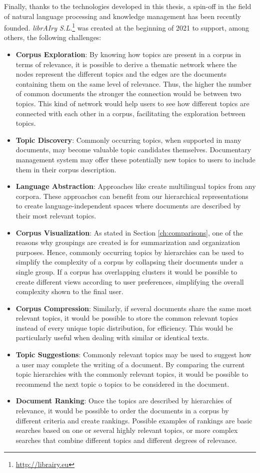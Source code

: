 Finally, thanks to the technologies developed in this thesis, a spin-off in the field of natural language processing and knowledge management has been recently founded. \textit{librAIry S.L.}\footnote{\url{http://librairy.eu}} was created at the beginning of 2021 to support, among others, the following challenges:
\begin{itemize}
\item \textbf{Corpus Exploration}: By knowing how topics are present in a corpus in terms of relevance, it is possible to derive a thematic network where the nodes represent the different topics and the edges are the documents containing them on the same level of relevance. Thus, the higher the number of common documents the stronger the connection would be between two topics. This kind of network would help users to see how different topics are connected with each other in a corpus, facilitating the exploration between topics.
\item \textbf{Topic Discovery}: Commonly occurring topics, when supported in many documents, may become valuable topic candidates themselves. Documentary management system may offer these potentially new topics to users to include them in their corpus description.
\item \textbf{Language Abstraction}: Approaches like \citep{hao-paul-2018-learning} create multilingual topics from any corpora. These approaches can benefit from our hierarchical representations to create language-independent spaces where documents are described by their most relevant topics.
\item \textbf{Corpus Visualization}: As stated in Section \ref{ch:comparisons}, one of the reasons why groupings are created is for summarization and organization purposes. Hence, commonly occurring topics by hierarchies can be used to simplify the complexity of a corpus by collapsing their documents under a single group. If a corpus has overlapping clusters it would be possible to create different views according to user preferences, simplifying the overall complexity shown to the final user.
\item \textbf{Corpus Compression}: Similarly, if several documents share the same most relevant topics, it would be possible to store the common relevant topics instead of every unique topic distribution, for efficiency. This would be particularly useful when dealing with similar or identical texts.
\item \textbf{Topic Suggestions}: Commonly relevant topics may be used to suggest how a user may complete the writing of a document. By comparing the current topic hierarchies with the commonly relevant topics, it would be possible to recommend the next topic o topics to be considered in the document.
\item \textbf{Document Ranking}: Once the topics are described by hierarchies of relevance, it would be possible to order the documents in a corpus by different criteria and create rankings. Possible examples of rankings are basic searches based on one or several highly relevant topics, or more complex searches that combine different topics and different degrees of relevance.  
\end{itemize}


